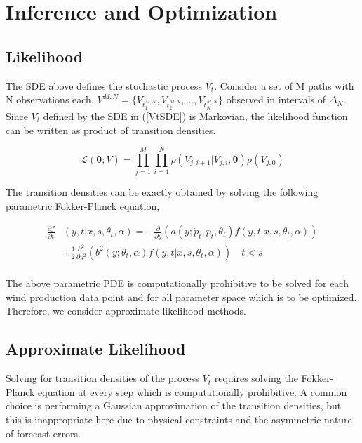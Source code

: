 \documentclass[10pt,twocolumn,letterpaper]{article}
\begin{document}
\section{Inference and Optimization}

\subsection{Likelihood}
The SDE above defines the stochastic process $V_t$. Consider a set of M paths with N observations each, $ V^{M,N}=\{ V_{t_1^{M,N}} , V_{t_2^{M,N}} ,\ldots , V_{t_N^{M,N}} \}$ observed in intervals of $\Delta_N$. Since $V_t$ defined by the SDE in (\ref{VtSDE}) is Markovian, the likelihood function can be written as product of transition densities.

\begin{equation}
\mathcal{L}(\bm{\theta};V) =\prod\limits_{j=1}^M \prod\limits_{i=1}^N \rho ( {V_{j,i+1}|V_{j,i}}, \bm{\theta})  \rho (V_{j,0})
\label{likelihood}
\end{equation}

The transition densities can be exactly obtained by solving the following parametric Fokker-Planck equation,

\begin{equation}
\begin{split}
\frac{ \partial f }{\partial t } & (y ,t | x , s, \theta_t, \alpha )= - \frac{\partial}{ \partial y} ( a( y;\dot{p}_t , p_t, \theta_t ) f( y ,t | x , s, \theta_t , \alpha ) ) \\
& + \frac{1}{2} \frac{\partial^2}{ \partial y^2} ( b^2(y;\theta_t, \alpha  )  f( y ,t | x , s, \theta_t , \alpha )  ) \quad  t < s\\
\end{split}
\end{equation}

The above parametric PDE is computationally prohibitive to be solved for each wind production data point and for all parameter space which is to be optimized. Therefore, we consider approximate likelihood methods.

\subsection{Approximate Likelihood}
Solving for transition densities of the process $V_t$ requires solving the Fokker-Planck equation at every step which is computationally prohibitive. A common choice is performing a Gaussian approximation of the transition densities, but this is inappropriate here due to physical constraints and the asymmetric nature of forecast errors. \\
\end{document}
